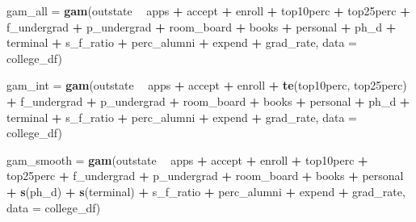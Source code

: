\documentclass[
]{article}
\newenvironment{Shaded}{\begin{snugshade}}{\end{snugshade}}
\newcommand{\DataTypeTok}[1]{\textcolor[rgb]{0.13,0.29,0.53}{#1}}
\newcommand{\KeywordTok}[1]{\textcolor[rgb]{0.13,0.29,0.53}{\textbf{#1}}}
\newcommand{\NormalTok}[1]{#1}
\newcommand{\OperatorTok}[1]{\textcolor[rgb]{0.81,0.36,0.00}{\textbf{#1}}}
\newcommand{\StringTok}[1]{\textcolor[rgb]{0.31,0.60,0.02}{#1}}
\begin{document}
\begin{Shaded}
\begin{Highlighting}[]
\NormalTok{gam_all =}\StringTok{ }\KeywordTok{gam}\NormalTok{(outstate }\OperatorTok{~}\StringTok{ }\NormalTok{apps }\OperatorTok{+}\StringTok{ }\NormalTok{accept }\OperatorTok{+}\StringTok{ }\NormalTok{enroll }\OperatorTok{+}\StringTok{ }\NormalTok{top10perc }\OperatorTok{+}\StringTok{ }\NormalTok{top25perc }\OperatorTok{+}\StringTok{ }\NormalTok{f_undergrad }\OperatorTok{+}\StringTok{ }\NormalTok{p_undergrad }\OperatorTok{+}\StringTok{ }\NormalTok{room_board }\OperatorTok{+}\StringTok{ }\NormalTok{books }\OperatorTok{+}\StringTok{ }\NormalTok{personal }\OperatorTok{+}\StringTok{ }\NormalTok{ph_d }\OperatorTok{+}\StringTok{ }\NormalTok{terminal }\OperatorTok{+}\StringTok{ }\NormalTok{s_f_ratio }\OperatorTok{+}\StringTok{ }\NormalTok{perc_alumni }\OperatorTok{+}\StringTok{ }\NormalTok{expend }\OperatorTok{+}\StringTok{ }\NormalTok{grad_rate, }\DataTypeTok{data =}\NormalTok{ college_df)}

\NormalTok{gam_int =}\StringTok{ }\KeywordTok{gam}\NormalTok{(outstate }\OperatorTok{~}\StringTok{ }\NormalTok{apps }\OperatorTok{+}\StringTok{ }\NormalTok{accept }\OperatorTok{+}\StringTok{ }\NormalTok{enroll }\OperatorTok{+}\StringTok{ }\KeywordTok{te}\NormalTok{(top10perc, top25perc) }\OperatorTok{+}\StringTok{ }\NormalTok{f_undergrad }\OperatorTok{+}\StringTok{ }\NormalTok{p_undergrad }\OperatorTok{+}\StringTok{ }\NormalTok{room_board }\OperatorTok{+}\StringTok{ }\NormalTok{books }\OperatorTok{+}\StringTok{ }\NormalTok{personal }\OperatorTok{+}\StringTok{ }\NormalTok{ph_d }\OperatorTok{+}\StringTok{ }\NormalTok{terminal }\OperatorTok{+}\StringTok{ }\NormalTok{s_f_ratio }\OperatorTok{+}\StringTok{ }\NormalTok{perc_alumni }\OperatorTok{+}\StringTok{ }\NormalTok{expend }\OperatorTok{+}\StringTok{ }\NormalTok{grad_rate, }\DataTypeTok{data =}\NormalTok{ college_df)}

\NormalTok{gam_smooth =}\StringTok{ }\KeywordTok{gam}\NormalTok{(outstate }\OperatorTok{~}\StringTok{ }\NormalTok{apps }\OperatorTok{+}\StringTok{ }\NormalTok{accept }\OperatorTok{+}\StringTok{ }\NormalTok{enroll }\OperatorTok{+}\StringTok{ }\NormalTok{top10perc }\OperatorTok{+}\StringTok{ }\NormalTok{top25perc }\OperatorTok{+}\StringTok{ }\NormalTok{f_undergrad }\OperatorTok{+}\StringTok{ }\NormalTok{p_undergrad }\OperatorTok{+}\StringTok{ }\NormalTok{room_board }\OperatorTok{+}\StringTok{ }\NormalTok{books }\OperatorTok{+}\StringTok{ }\NormalTok{personal }\OperatorTok{+}\StringTok{ }\KeywordTok{s}\NormalTok{(ph_d) }\OperatorTok{+}\StringTok{ }\KeywordTok{s}\NormalTok{(terminal) }\OperatorTok{+}\StringTok{ }\NormalTok{s_f_ratio }\OperatorTok{+}\StringTok{ }\NormalTok{perc_alumni }\OperatorTok{+}\StringTok{ }\NormalTok{expend }\OperatorTok{+}\StringTok{ }\NormalTok{grad_rate, }\DataTypeTok{data =}\NormalTok{ college_df)}


\end{Highlighting}
\end{Shaded}
\end{document}
